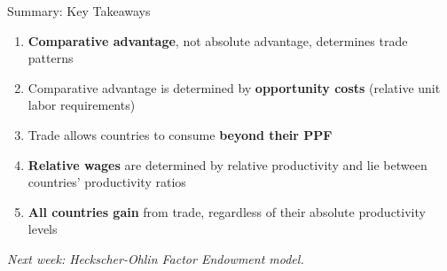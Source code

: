 \documentclass{beamer}
\begin{document}

\begin{frame}{Summary: Key Takeaways}

\begin{enumerate}
    \item \textbf{Comparative advantage}, not absolute advantage, determines trade patterns
    
    \vspace{0.3cm}
    
    \item Comparative advantage is determined by \textbf{opportunity costs} (relative unit labor requirements)
    
    \vspace{0.3cm}
    
    \item Trade allows countries to consume \textbf{beyond their PPF}
    
    \vspace{0.3cm}
    
    \item \textbf{Relative wages} are determined by relative productivity and lie between countries' productivity ratios
    
    \vspace{0.3cm}
    
    \item \textbf{All countries gain} from trade, regardless of their absolute productivity levels
\end{enumerate}

\vspace{0.5cm}

\textit{Next week: Heckscher-Ohlin Factor Endowment model.}

\end{frame}





\end{document}
